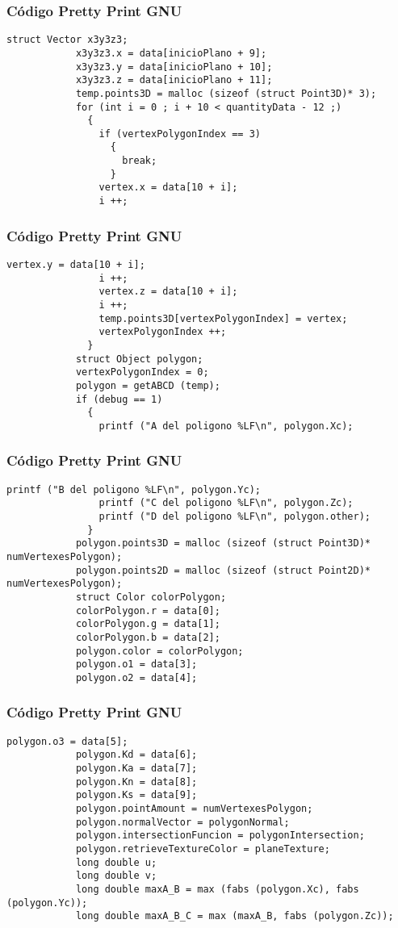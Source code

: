 \documentclass{beamer}
\begin{document}
\begin{frame}[fragile]
\frametitle{C\'odigo Pretty Print GNU}
\begin{lstlisting}[style=CStyle]
            struct Vector x3y3z3;
            x3y3z3.x = data[inicioPlano + 9];
            x3y3z3.y = data[inicioPlano + 10];
            x3y3z3.z = data[inicioPlano + 11];
            temp.points3D = malloc (sizeof (struct Point3D)* 3);
            for (int i = 0 ; i + 10 < quantityData - 12 ;)
              {
                if (vertexPolygonIndex == 3)
                  {
                    break;
                  }
                vertex.x = data[10 + i];
                i ++;
\end{lstlisting}
\end{frame}
\begin{frame}[fragile]
\frametitle{C\'odigo Pretty Print GNU}
\begin{lstlisting}[style=CStyle]
                vertex.y = data[10 + i];
                i ++;
                vertex.z = data[10 + i];
                i ++;
                temp.points3D[vertexPolygonIndex] = vertex;
                vertexPolygonIndex ++;
              }
            struct Object polygon;
            vertexPolygonIndex = 0;
            polygon = getABCD (temp);
            if (debug == 1)
              {
                printf ("A del poligono %LF\n", polygon.Xc);
\end{lstlisting}
\end{frame}
\begin{frame}[fragile]
\frametitle{C\'odigo Pretty Print GNU}
\begin{lstlisting}[style=CStyle]
                printf ("B del poligono %LF\n", polygon.Yc);
                printf ("C del poligono %LF\n", polygon.Zc);
                printf ("D del poligono %LF\n", polygon.other);
              }
            polygon.points3D = malloc (sizeof (struct Point3D)* numVertexesPolygon);
            polygon.points2D = malloc (sizeof (struct Point2D)* numVertexesPolygon);
            struct Color colorPolygon;
            colorPolygon.r = data[0];
            colorPolygon.g = data[1];
            colorPolygon.b = data[2];
            polygon.color = colorPolygon;
            polygon.o1 = data[3];
            polygon.o2 = data[4];
\end{lstlisting}
\end{frame}
\begin{frame}[fragile]
\frametitle{C\'odigo Pretty Print GNU}
\begin{lstlisting}[style=CStyle]
            polygon.o3 = data[5];
            polygon.Kd = data[6];
            polygon.Ka = data[7];
            polygon.Kn = data[8];
            polygon.Ks = data[9];
            polygon.pointAmount = numVertexesPolygon;
            polygon.normalVector = polygonNormal;
            polygon.intersectionFuncion = polygonIntersection;
            polygon.retrieveTextureColor = planeTexture;
            long double u;
            long double v;
            long double maxA_B = max (fabs (polygon.Xc), fabs (polygon.Yc));
            long double maxA_B_C = max (maxA_B, fabs (polygon.Zc));
\end{lstlisting}
\end{frame}
\end{document}
